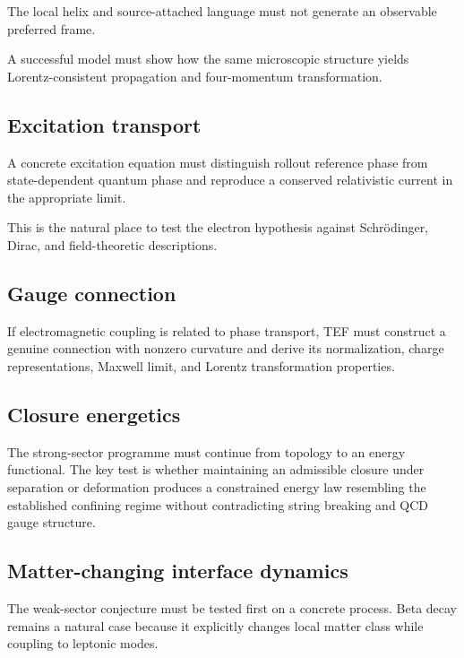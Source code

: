 \documentclass[10pt]{article}
\begin{document}
The local helix and source-attached language must not generate an observable preferred frame.

A successful model must show how the same microscopic structure yields Lorentz-consistent propagation and four-momentum transformation.

\subsection{Excitation transport}\label{excitation-transport}

A concrete excitation equation must distinguish rollout reference phase from state-dependent quantum phase and reproduce a conserved relativistic current in the appropriate limit.

This is the natural place to test the electron hypothesis against Schrödinger, Dirac, and field-theoretic descriptions.

\subsection{Gauge connection}\label{gauge-connection}

If electromagnetic coupling is related to phase transport, TEF must construct a genuine connection with nonzero curvature and derive its normalization, charge representations, Maxwell limit, and Lorentz transformation properties.

\subsection{Closure energetics}\label{closure-energetics}

The strong-sector programme must continue from topology to an energy functional. The key test is whether maintaining an admissible closure under separation or deformation produces a constrained energy law resembling the established confining regime without contradicting string breaking and QCD gauge structure.

\subsection{Matter-changing interface dynamics}\label{matter-changing-interface-dynamics}

The weak-sector conjecture must be tested first on a concrete process. Beta decay remains a natural case because it explicitly changes local matter class while coupling to leptonic modes.
\end{document}
